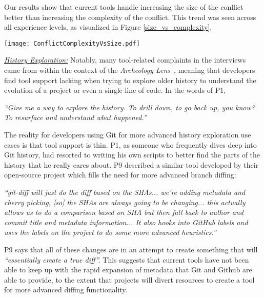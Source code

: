 Our results show that current tools handle increasing the size of the conflict better than increasing the complexity of the conflict. This trend was seen across all experience levels, as visualized in Figure \ref{size_vs_complexity}.

\begin{figure*}[!t]
\centering
\texttt{[image: ConflictComplexityVsSize.pdf]}
\caption{Effectiveness of developer tools in supporting varying levels of size and complexity (by developer experience). Values are number of responses per answer, and bubble size indicates the number of responses for comparison purposes.}
\label{size_vs_complexity}
\end{figure*}

\underline{\textit{History Exploration:}}
Notably, many tool-related complaints in the interviews came from within the context of the \textit{Archeology Lens}~\cite{mihai_lenses}, meaning that developers find tool support lacking when trying to explore older history to understand the evolution of a project or even a single line of code. In the words of P1, 

\begin{displayquote}
\textit{``Give me a way to explore the history. To drill down, to go back up, you know? To resurface and understand what happened.''}
\end{displayquote}

The reality for developers using Git for more advanced history exploration use cases is that tool support is thin. P1, as someone who frequently dives deep into Git history, had resorted to writing his own scripts to better find the parts of the history that he really cares about. P9 described a similar tool developed by their open-source project which fills the need for more advanced branch diffing:
\begin{displayquote}
\textit{``git-diff will just do the diff based on the SHAs... we're adding metadata and cherry picking, [so] the SHAs are always going to be changing... this actually allows us to do a comparison based on SHA but then fall back to author and commit title and metadata information... It also hooks into GitHub labels and uses the labels on the project to do some more advanced heuristics.''}
\end{displayquote}

P9 says that all of these changes are in an attempt to create something that will \textit{``essentially create a true diff''.}
This suggests that current tools have not been able to keep up with the rapid expansion of metadata that Git and Github are able to provide, to the extent that projects will divert resources to create a tool for more advanced diffing functionality. 

